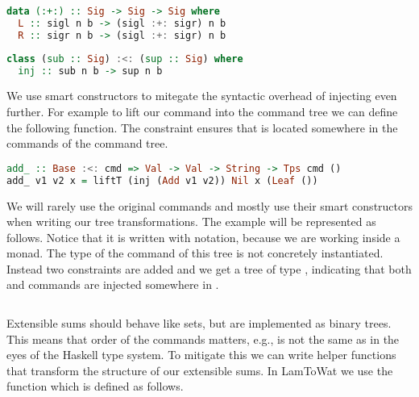 \begin{lstlisting}[language=Haskell]
data (:+:) :: Sig -> Sig -> Sig where
  L :: sigl n b -> (sigl :+: sigr) n b
  R :: sigr n b -> (sigl :+: sigr) n b
\end{lstlisting}

\begin{lstlisting}[language=Haskell]
class (sub :: Sig) :<: (sup :: Sig) where
  inj :: sub n b -> sup n b
\end{lstlisting}

We use smart constructors to mitegate the syntactic overhead of injecting \autocite{DBLP:conf/haskell/WuSH14, DBLP:conf/popl/LiangHJ95} even further. For example to lift our  command into the command tree we can define the following function. The constraint  ensures that  is located somewhere in the commands of the command tree.

\begin{lstlisting}[language=Haskell]
add_ :: Base :<: cmd => Val -> Val -> String -> Tps cmd ()
add_ v1 v2 x = liftT (inj (Add v1 v2)) Nil x (Leaf ())
\end{lstlisting}

We will rarely use the original commands and mostly use their smart constructors when writing our tree transformations. The  example will be represented as follows. Notice that it is written with  notation, because we are working inside a monad. The type of the command of this tree is not concretely instantiated. Instead two constraints are added and we get a tree of type , indicating that both  and  commands are injected somewhere in .

\begin{lstlisting}[language=Haskell]
\end{lstlisting}

Extensible sums should behave like sets, but are implemented as binary trees. This means that order of the commands matters, e.g.,  is not the same as  in the eyes of the Haskell type system. To mitigate this we can write helper functions that transform the structure of our extensible sums. In LamToWat we use the  function which is defined as follows. 

\begin{lstlisting}[language=Haskell]
\end{lstlisting}

